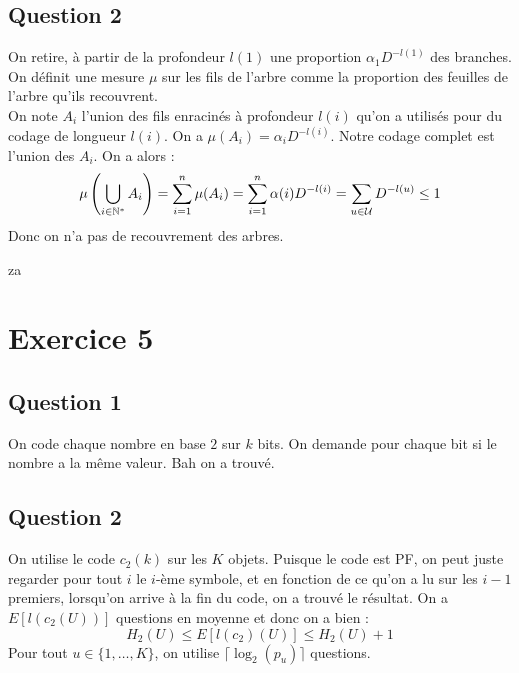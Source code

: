 \documentclass{cours}
\begin{document}
\subsection{Question 2}
On retire, à partir de la profondeur $l(1)$ une proportion $\alpha_{1}D^{-l(1)}$ des branches. On définit une mesure $\mu$ sur les fils de l'arbre comme la proportion des feuilles de l'arbre qu'ils recouvrent. \\
On note $A_{i}$ l'union des fils enracinés à profondeur $l(i)$ qu'on a utilisés pour du codage de longueur $l(i)$. On a $\mu(A_{i}) = \alpha_{i}D^{-l(i)}$. Notre codage complet est l'union des $A_{i}$. On a alors : 
\[
    \mu\left(\bigcup_{i \in \mathbb{N}^{*}} A_{i}\right) = \sum_{i = 1}^{n} \mu(A_{i}) = \sum_{i = 1}^{n}\alpha(i)D^{-l(i)} = \sum_{u \in \mathcal{U}} D^{-l(u)} \leq 1
\]
Donc on n'a pas de recouvrement des arbres. 

za
\section{Exercice 5}
\subsection{Question 1}
On code chaque nombre en base $2$ sur $k$ bits. On demande pour chaque bit si le nombre a la même valeur. Bah on a trouvé.

\subsection{Question 2}
On utilise le code $c_{2}(k)$ sur les $K$ objets. 
Puisque le code est PF, on peut juste regarder pour tout $i$ le $i$-ème symbole, et en fonction de ce qu'on a lu sur les $i-1$ premiers, lorsqu'on arrive à la fin du code, on a trouvé le résultat. 
On a $E[l(c_{2}(U))]$ questions en moyenne et donc on a bien : 
\[
    H_{2}(U) \leq E[l(c_{2})(U)] \leq H_{2}(U) + 1
\]
Pour tout $u \in \{1, \ldots, K\}$, on utilise $\lceil\log_{2}(p_{u})\rceil$ questions.
\end{document}
